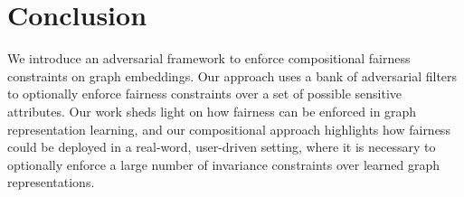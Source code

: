 \section{Conclusion}
We introduce an adversarial framework to enforce compositional fairness constraints on graph embeddings. 
Our approach uses a bank of adversarial filters to optionally enforce fairness constraints over a set of possible sensitive attributes.
Our work sheds light on how fairness can be enforced in graph representation learning, and our compositional approach highlights how fairness could be deployed in a real-word, user-driven setting, where it is necessary to optionally enforce a large number of invariance constraints over learned graph representations.
